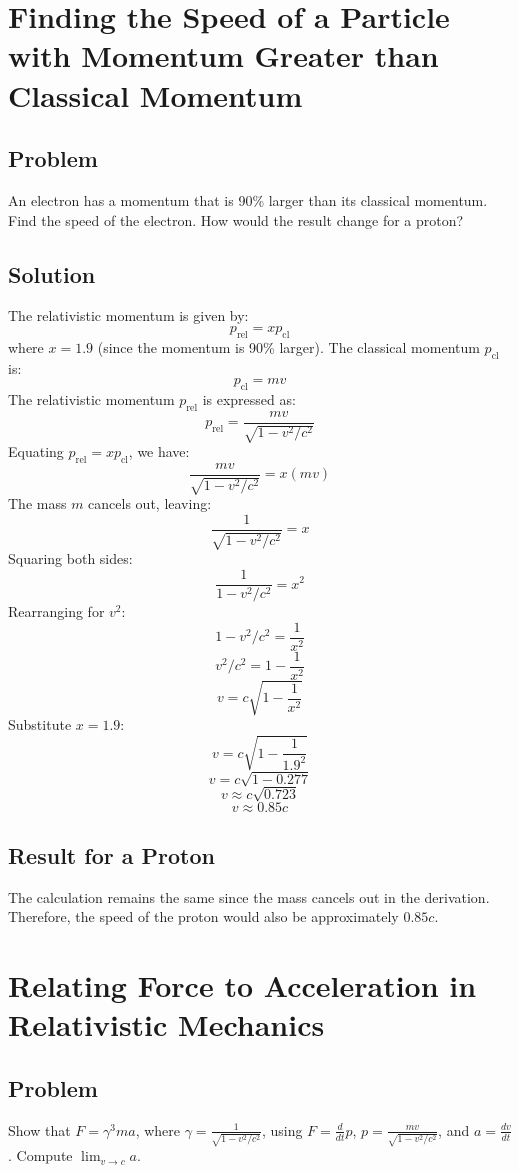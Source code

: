 \documentclass[a4paper,12pt]{article}
\begin{document}
\begin{multicols}{2}
\section*{Finding the Speed of a Particle with Momentum Greater than Classical Momentum}

\subsection*{Problem}
An electron has a momentum that is 90\% larger than its classical momentum. Find the speed of the electron. How would the result change for a proton?

\subsection*{Solution}
The relativistic momentum is given by:
\[
p_{\text{rel}} = x p_{\text{cl}}
\]
where \(x = 1.9\) (since the momentum is 90\% larger). The classical momentum \(p_{\text{cl}}\) is:
\[
p_{\text{cl}} = mv
\]
The relativistic momentum \(p_{\text{rel}}\) is expressed as:
\[
p_{\text{rel}} = \frac{mv}{\sqrt{1 - v^2/c^2}}
\]
Equating \(p_{\text{rel}} = x p_{\text{cl}}\), we have:
\[
\frac{mv}{\sqrt{1 - v^2/c^2}} = x (mv)
\]
The mass \(m\) cancels out, leaving:
\[
\frac{1}{\sqrt{1 - v^2/c^2}} = x
\]
Squaring both sides:
\[
\frac{1}{1 - v^2/c^2} = x^2
\]
Rearranging for \(v^2\):
\[
1 - v^2/c^2 = \frac{1}{x^2}
\]
\[
v^2/c^2 = 1 - \frac{1}{x^2}
\]
\[
v = c \sqrt{1 - \frac{1}{x^2}}
\]
Substitute \(x = 1.9\):
\[
v = c \sqrt{1 - \frac{1}{1.9^2}}
\]
\[
v = c \sqrt{1 - 0.277}
\]
\[
v \approx c \sqrt{0.723}
\]
\[
v \approx 0.85c
\]

\subsection*{Result for a Proton}
The calculation remains the same since the mass cancels out in the derivation. Therefore, the speed of the proton would also be approximately \(0.85c\).

\section*{Relating Force to Acceleration in Relativistic Mechanics}

\subsection*{Problem}
Show that \(F = \gamma^3 ma\), where \(\gamma = \frac{1}{\sqrt{1 - v^2/c^2}}\), using \(F = \frac{d}{dt}p\), \(p = \frac{mv}{\sqrt{1 - v^2/c^2}}\), and \(a = \frac{dv}{dt}\). Compute \(\lim_{v \to c} a\).


\end{multicols}
\end{document}
